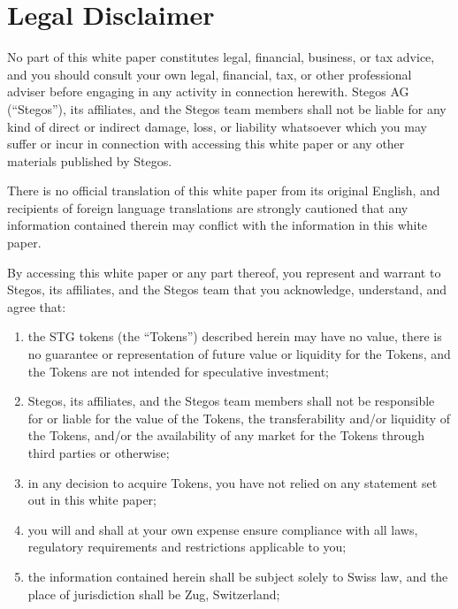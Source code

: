 \documentclass[8pt,fleqn,openany]{book}
\begin{document}
{		\chapter{Legal Disclaimer}
		
		No part of this white paper constitutes legal, financial, business, or tax advice, and you should consult your own legal, financial, tax, or other professional adviser before engaging in any activity in connection herewith. Stegos AG (“Stegos”), its affiliates, and the Stegos team members shall not be liable for any kind of direct or indirect damage, loss, or liability whatsoever which you may suffer or incur in connection with accessing this white paper or any other materials published by Stegos. 
		
		There is no official translation of this white paper from its original English, and recipients of foreign language translations are strongly cautioned that any information contained therein may conflict with the information in this white paper. 
		
		By accessing this white paper or any part thereof, you represent and warrant to Stegos, its affiliates, and the Stegos team that you acknowledge, understand, and agree that: 
		
		\begin{enumerate}[label=(\alph*)]
			\item the STG tokens (the “Tokens”) described herein may have no value, there is no guarantee or representation of future value or liquidity for the Tokens, and the Tokens are not intended for speculative investment; 
			
			\item Stegos, its affiliates, and the Stegos team members shall not be responsible for or liable for the value of the Tokens, the transferability and/or liquidity of the Tokens, and/or the availability of any market for the Tokens through third parties or otherwise; 
			
			\item in any decision to acquire Tokens, you have not relied on any statement set out in this white paper; 
			
			\item you will and shall at your own expense ensure compliance with all laws, regulatory requirements and restrictions applicable to you; 
			
			\item the information contained herein shall be subject solely to Swiss law, and the place of jurisdiction shall be Zug, Switzerland; 
			

\end{enumerate}}
\end{document}
